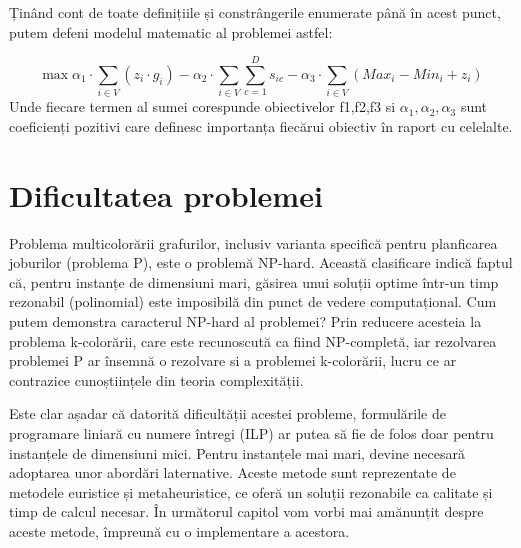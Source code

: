     Ținând cont de toate definițiile și constrângerile enumerate până în acest punct, putem defeni modelul matematic al problemei astfel:
    \begin{Def}
      \begin{equation}
        \max  \alpha_1 \cdot \sum_{i \in V} (z_i \cdot g_i) - \alpha_2 \cdot \sum_{i \in V} \sum_{c=1}^{D} s_{ic}  - \alpha_3 \cdot \sum_{i \in V} (Max_i - Min_i + z_i)
      \end{equation}
      Unde fiecare termen al sumei corespunde obiectivelor f1,f2,f3 si $\alpha_1, \alpha_2, \alpha_3$ sunt coeficienți pozitivi care definesc importanța fiecărui obiectiv în raport cu celelalte.
    \end{Def}

\section{Dificultatea problemei}
   Problema multicolorării grafurilor, inclusiv varianta specifică pentru planficarea joburilor (problema P), este o problemă NP-hard. Această clasificare indică faptul că, pentru instanțe de dimensiuni mari, găsirea unui soluții optime într-un timp rezonabil (polinomial) este imposibilă din punct de vedere computațional. Cum putem demonstra caracterul NP-hard al problemei? Prin reducere acesteia la problema k-colorării, care este recunoscută ca fiind NP-completă\cite{garey1979computers}\cite{gabow1992edgecoloring}\cite{gandhi2004approximating}\cite{gandhi2004improved}, iar rezolvarea problemei P ar însemnă o rezolvare si a problemei k-colorării, lucru ce ar contrazice cunoștiințele din teoria complexității.
 
   Este clar așadar că datorită dificultății acestei probleme, formulările de programare liniară cu numere întregi (ILP) ar putea să fie de folos doar pentru instanțele de dimensiuni mici. Pentru instanțele mai mari, devine necesară adoptarea unor abordări laternative. Aceste metode sunt reprezentate de metodele euristice și metaheuristice, ce oferă un soluții rezonabile ca calitate și timp de calcul necesar. În următorul capitol vom vorbi mai amănunțit despre aceste metode, împreună cu o implementare a acestora.